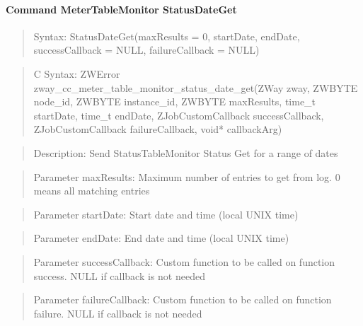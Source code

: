 \paragraph{Command MeterTableMonitor StatusDateGet}
\begin{quote}Syntax: StatusDateGet(maxResults = 0, startDate, endDate, successCallback = NULL, failureCallback = NULL)\end{quote}
\begin{quote}C Syntax: ZWError zway\_cc\_meter\_table\_monitor\_status\_date\_get(ZWay zway, ZWBYTE node\_id, ZWBYTE instance\_id, ZWBYTE maxResults, time\_t startDate, time\_t endDate, ZJobCustomCallback successCallback, ZJobCustomCallback failureCallback, void* callbackArg)\end{quote}
\begin{quote}Description: Send StatusTableMonitor Status Get for a range of dates\end{quote}
\begin{quote}Parameter maxResults: Maximum number of entries to get from log. 0 means all matching entries\end{quote}
\begin{quote}Parameter startDate: Start date and time (local UNIX time)\end{quote}
\begin{quote}Parameter endDate: End date and time (local UNIX time)\end{quote}
\begin{quote}Parameter successCallback: Custom function to be called on function success. NULL if callback is not needed\end{quote}
\begin{quote}Parameter failureCallback: Custom function to be called on function failure. NULL if callback is not needed\end{quote}


